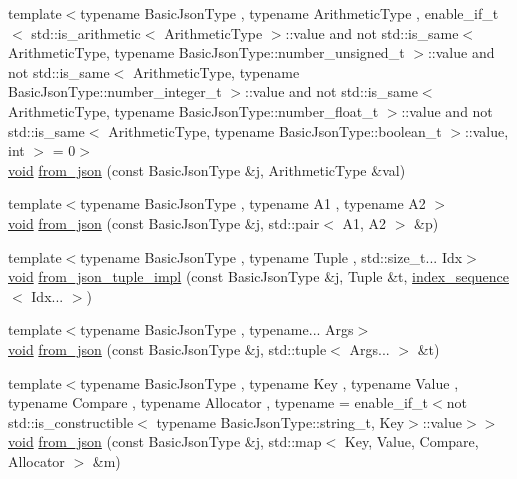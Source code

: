 \begin{DoxyCompactItemize}
{\footnotesize template$<$typename Basic\+Json\+Type , typename Arithmetic\+Type , enable\+\_\+if\+\_\+t$<$ std\+::is\+\_\+arithmetic$<$ Arithmetic\+Type $>$\+::value and not std\+::is\+\_\+same$<$ Arithmetic\+Type, typename Basic\+Json\+Type\+::number\+\_\+unsigned\+\_\+t $>$\+::value and not std\+::is\+\_\+same$<$ Arithmetic\+Type, typename Basic\+Json\+Type\+::number\+\_\+integer\+\_\+t $>$\+::value and not std\+::is\+\_\+same$<$ Arithmetic\+Type, typename Basic\+Json\+Type\+::number\+\_\+float\+\_\+t $>$\+::value and not std\+::is\+\_\+same$<$ Arithmetic\+Type, typename Basic\+Json\+Type\+::boolean\+\_\+t $>$\+::value, int $>$  = 0$>$ }\\\hyperlink{namespacenlohmann_1_1detail_a59fca69799f6b9e366710cb9043aa77d}{void} \hyperlink{namespacenlohmann_1_1detail_a839b0ab50d2c9bce669068f56bc41202}{from\+\_\+json} (const Basic\+Json\+Type \&j, Arithmetic\+Type \&val)
\item 
{\footnotesize template$<$typename Basic\+Json\+Type , typename A1 , typename A2 $>$ }\\\hyperlink{namespacenlohmann_1_1detail_a59fca69799f6b9e366710cb9043aa77d}{void} \hyperlink{namespacenlohmann_1_1detail_aae9f9c2601074e323d49428132cc293d}{from\+\_\+json} (const Basic\+Json\+Type \&j, std\+::pair$<$ A1, A2 $>$ \&p)
\item 
{\footnotesize template$<$typename Basic\+Json\+Type , typename Tuple , std\+::size\+\_\+t... Idx$>$ }\\\hyperlink{namespacenlohmann_1_1detail_a59fca69799f6b9e366710cb9043aa77d}{void} \hyperlink{namespacenlohmann_1_1detail_a28253915d9db4a0112d60eaee0422949}{from\+\_\+json\+\_\+tuple\+\_\+impl} (const Basic\+Json\+Type \&j, Tuple \&t, \hyperlink{structnlohmann_1_1detail_1_1index__sequence}{index\+\_\+sequence}$<$ Idx... $>$)
\item 
{\footnotesize template$<$typename Basic\+Json\+Type , typename... Args$>$ }\\\hyperlink{namespacenlohmann_1_1detail_a59fca69799f6b9e366710cb9043aa77d}{void} \hyperlink{namespacenlohmann_1_1detail_a8b99ec9b29f3f20a18fc4281fb784e49}{from\+\_\+json} (const Basic\+Json\+Type \&j, std\+::tuple$<$ Args... $>$ \&t)
\item 
{\footnotesize template$<$typename Basic\+Json\+Type , typename Key , typename Value , typename Compare , typename Allocator , typename  = enable\+\_\+if\+\_\+t$<$not std\+::is\+\_\+constructible$<$                                     typename Basic\+Json\+Type\+::string\+\_\+t, Key$>$\+::value$>$$>$ }\\\hyperlink{namespacenlohmann_1_1detail_a59fca69799f6b9e366710cb9043aa77d}{void} \hyperlink{namespacenlohmann_1_1detail_ae93147a54d2740228ef16a5e6210ca3e}{from\+\_\+json} (const Basic\+Json\+Type \&j, std\+::map$<$ Key, Value, Compare, Allocator $>$ \&m)

\end{DoxyCompactItemize}
